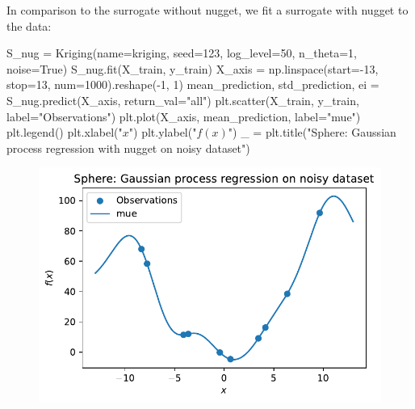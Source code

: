 \documentclass[
  letterpaper,
  DIV=11,
  numbers=noendperiod]{scrreprt}
\newenvironment{Shaded}{\begin{snugshade}}{\end{snugshade}}
\newcommand{\DecValTok}[1]{\textcolor[rgb]{0.68,0.00,0.00}{#1}}
\newcommand{\NormalTok}[1]{\textcolor[rgb]{0.00,0.23,0.31}{#1}}
\newcommand{\OperatorTok}[1]{\textcolor[rgb]{0.37,0.37,0.37}{#1}}
\newcommand{\StringTok}[1]{\textcolor[rgb]{0.13,0.47,0.30}{#1}}
\newcommand{\VariableTok}[1]{\textcolor[rgb]{0.07,0.07,0.07}{#1}}
\begin{document}
In comparison to the surrogate without nugget, we fit a surrogate with
nugget to the data:

\begin{Shaded}
\begin{Highlighting}[]
\NormalTok{S\_nug }\OperatorTok{=}\NormalTok{ Kriging(name}\OperatorTok{=}\StringTok{\textquotesingle{}kriging\textquotesingle{}}\NormalTok{,}
\NormalTok{            seed}\OperatorTok{=}\DecValTok{123}\NormalTok{,}
\NormalTok{            log\_level}\OperatorTok{=}\DecValTok{50}\NormalTok{,}
\NormalTok{            n\_theta}\OperatorTok{=}\DecValTok{1}\NormalTok{,}
\NormalTok{            noise}\OperatorTok{=}\VariableTok{True}\NormalTok{)}
\NormalTok{S\_nug.fit(X\_train, y\_train)}
\NormalTok{X\_axis }\OperatorTok{=}\NormalTok{ np.linspace(start}\OperatorTok{={-}}\DecValTok{13}\NormalTok{, stop}\OperatorTok{=}\DecValTok{13}\NormalTok{, num}\OperatorTok{=}\DecValTok{1000}\NormalTok{).reshape(}\OperatorTok{{-}}\DecValTok{1}\NormalTok{, }\DecValTok{1}\NormalTok{)}
\NormalTok{mean\_prediction, std\_prediction, ei }\OperatorTok{=}\NormalTok{ S\_nug.predict(X\_axis, return\_val}\OperatorTok{=}\StringTok{"all"}\NormalTok{)}
\NormalTok{plt.scatter(X\_train, y\_train, label}\OperatorTok{=}\StringTok{"Observations"}\NormalTok{)}
\NormalTok{plt.plot(X\_axis, mean\_prediction, label}\OperatorTok{=}\StringTok{"mue"}\NormalTok{)}
\NormalTok{plt.legend()}
\NormalTok{plt.xlabel(}\StringTok{"$x$"}\NormalTok{)}
\NormalTok{plt.ylabel(}\StringTok{"$f(x)$"}\NormalTok{)}
\NormalTok{\_ }\OperatorTok{=}\NormalTok{ plt.title(}\StringTok{"Sphere: Gaussian process regression with nugget on noisy dataset"}\NormalTok{)}
\end{Highlighting}
\end{Shaded}

\begin{figure}[H]

{\centering \includegraphics{014_num_spot_ocba_files/figure-pdf/cell-11-output-1.pdf}

}

\end{figure}
\end{document}
